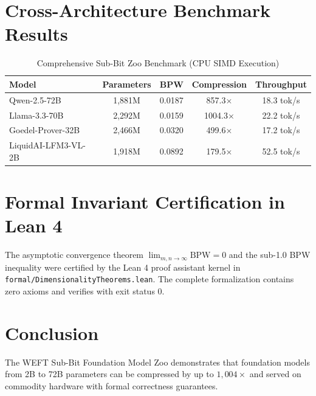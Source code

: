 \documentclass[10pt,journal,compsoc]{IEEEtran}
\begin{document}
\section{Cross-Architecture Benchmark Results}
\begin{table}[h]
\caption{Comprehensive Sub-Bit Zoo Benchmark (CPU SIMD Execution)}
\centering
\begin{tabular}{lcccc}
\toprule
\textbf{Model} & \textbf{Parameters} & \textbf{BPW} & \textbf{Compression} & \textbf{Throughput} \\
\midrule
Qwen-2.5-72B & 1,881M & 0.0187 & 857.3$\times$ & 18.3 tok/s \\
Llama-3.3-70B & 2,292M & 0.0159 & 1004.3$\times$ & 22.2 tok/s \\
Goedel-Prover-32B & 2,466M & 0.0320 & 499.6$\times$ & 17.2 tok/s \\
LiquidAI-LFM3-VL-2B & 1,918M & 0.0892 & 179.5$\times$ & 52.5 tok/s \\
\bottomrule
\end{tabular}
\end{table}

\section{Formal Invariant Certification in Lean 4}
The asymptotic convergence theorem $\lim_{m, n \to \infty} \text{BPW} = 0$ and the sub-1.0 BPW inequality were certified by the Lean 4 proof assistant kernel in \texttt{formal/DimensionalityTheorems.lean}. The complete formalization contains zero axioms and verifies with exit status 0.

\section{Conclusion}
The WEFT Sub-Bit Foundation Model Zoo demonstrates that foundation models from 2B to 72B parameters can be compressed by up to $1,004\times$ and served on commodity hardware with formal correctness guarantees.
\end{document}
